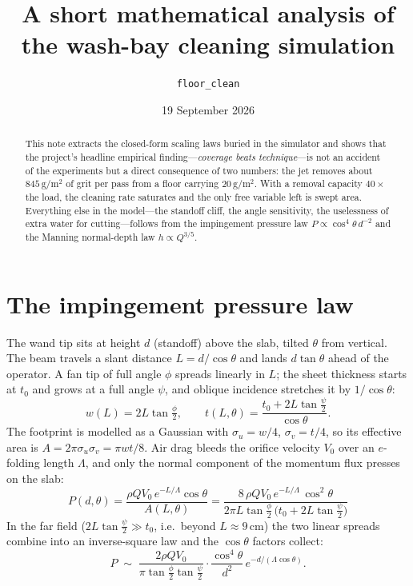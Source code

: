 \documentclass[11pt,a4paper]{article}
\title{A short mathematical analysis of the wash-bay cleaning simulation}
\author{\texttt{floor\_clean}}
\date{19 September 2026}
\newcommand{\SI}[2]{\ensuremath{#1\,#2}}
\newcommand{\per}{\ensuremath{/}}
\newcommand{\squared}[1]{\ensuremath{#1^{2}}}
\newcommand{\metre}{\ensuremath{\mathrm{m}}}
\newcommand{\gram}{\ensuremath{\mathrm{g}}}
\newcommand{\centi}{\ensuremath{\mathrm{c}}}
\begin{document}
\maketitle

\begin{abstract}
This note extracts the closed-form scaling laws buried in the simulator and
shows that the project's headline empirical finding---\emph{coverage beats
technique}---is not an accident of the experiments but a direct consequence of
two numbers: the jet removes about \SI{845}{\gram\per\squared{\metre}} of grit per
pass from a floor carrying \SI{20}{\gram\per\squared{\metre}}. With a removal
capacity $40\times$ the load, the cleaning rate saturates and the only free
variable left is swept area. Everything else in the model---the standoff cliff,
the angle sensitivity, the uselessness of extra water for cutting---follows
from the impingement pressure law $P \propto \cos^{4}\theta \, d^{-2}$ and the
Manning normal-depth law $h \propto Q^{3/5}$.
\end{abstract}

\section{The impingement pressure law}

The wand tip sits at height $d$ (standoff) above the slab, tilted $\theta$ from
vertical. The beam travels a slant distance $L = d/\cos\theta$ and lands
$d\tan\theta$ ahead of the operator. A fan tip of full angle $\phi$ spreads
linearly in $L$; the sheet thickness starts at $t_{0}$ and grows at a full
angle $\psi$, and oblique incidence stretches it by $1/\cos\theta$:
\begin{equation}
  w(L) = 2L\tan\tfrac{\phi}{2},
  \qquad
  t(L,\theta) = \frac{t_{0} + 2L\tan\tfrac{\psi}{2}}{\cos\theta}.
\end{equation}
The footprint is modelled as a Gaussian with $\sigma_{u}=w/4$, $\sigma_{v}=t/4$,
so its effective area is $A = 2\pi\sigma_{u}\sigma_{v} = \pi w t / 8$. Air drag
bleeds the orifice velocity $V_{0}$ over an $e$-folding length $\Lambda$, and
only the normal component of the momentum flux presses on the slab:
\begin{equation}
  \boxed{\;
  P(d,\theta)
  = \frac{\rho Q V_{0}\,e^{-L/\Lambda}\cos\theta}{A(L,\theta)}
  = \frac{8\,\rho Q V_{0}\,e^{-L/\Lambda}\,\cos^{2}\theta}
         {2\pi L \tan\tfrac{\phi}{2}\,\bigl(t_{0}+2L\tan\tfrac{\psi}{2}\bigr)}\;}
\end{equation}
In the far field ($2L\tan\tfrac{\psi}{2}\gg t_{0}$, i.e.\ beyond
$L\approx\SI{9}{\centi\metre}$) the two linear spreads combine into an
inverse-square law and the $\cos\theta$ factors collect:
\begin{equation}
  P \;\sim\; \frac{2\rho Q V_{0}}{\pi\tan\tfrac{\phi}{2}\tan\tfrac{\psi}{2}}
  \cdot \frac{\cos^{4}\theta}{d^{2}}\, e^{-d/(\Lambda\cos\theta)} .
  \label{eq:scaling}
\end{equation}
\end{document}
